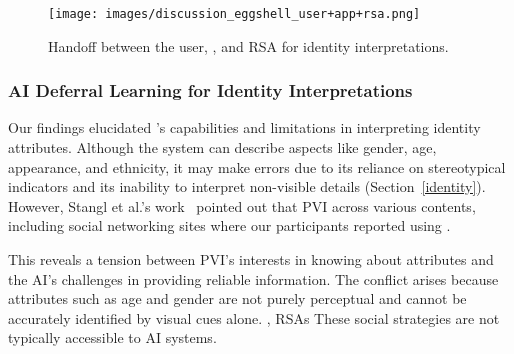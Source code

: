 





\begin{figure*}[h!]
\centering
\texttt{[image: images/discussion\_eggshell\_user+app+rsa.png]}
\caption{Handoff between the user, \bma, and RSA for identity interpretations.}
\label{fig.discussion_eggshell_user+app+rsa}
\end{figure*}




\subsubsection{AI Deferral Learning for Identity Interpretations} 
\label{sec:deferral_learning}
% 


Our findings elucidated \sbma's capabilities and limitations in interpreting identity attributes. Although the system can describe aspects like gender, age, appearance, and ethnicity, it may make errors due to its reliance on stereotypical indicators and its inability to interpret non-visible details (Section~\ref{identity}).
% 
However, Stangl et al.'s work~\cite{stangl2020person} pointed out that PVI  across various contents, including  social networking sites where our participants reported using \bma.


This reveals a tension between PVI's interests in knowing about  attributes and the AI's challenges in providing reliable information. The conflict arises because attributes such as age and gender are not purely perceptual and cannot be accurately identified by visual cues alone. , RSAs  These social strategies are not typically accessible to AI systems. 


